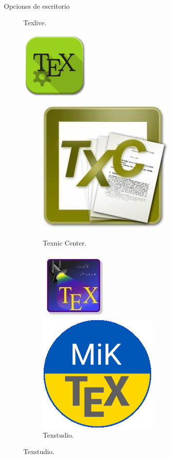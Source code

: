 \documentclass[aspectratio=169, 10pt]{beamer}
\begin{document}
\begin{frame}{Opciones de escritorio}
\begin{figure}
\begin{minipage}{0.10\textwidth}
        \caption*{Texlive.}
    \end{minipage}\hfill
    \begin{minipage}{0.10\textwidth}
        \includegraphics[scale=0.10]{texmaker.png} 
        \caption*{Texmaker.}
    \end{minipage}

    \begin{figure}
    \centering
    \begin{minipage}{0.10\textwidth}
        \includegraphics[scale=0.10]{texnicCenter.jpg} 
        \caption*{Texnic Center.}
    \end{minipage}\hfill
    \begin{minipage}{0.10\textwidth}
        \includegraphics[scale=0.10]{texstudio.jpg} 
        \caption*{Texstudio.}
    \end{minipage}\hfill
    \begin{minipage}{0.10\textwidth}
        \includegraphics[scale=0.10]{miktex1.png} 

\end{minipage}
\end{figure}
\end{figure}
\end{frame}
\end{document}
